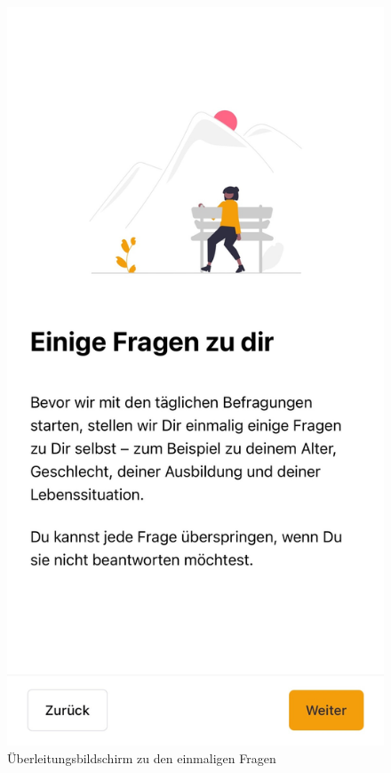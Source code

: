 \begin{figure}[h]
    \centering
    \begin{minipage}[t]{0.38\textwidth}
        \centering
        \includegraphics[width=\textwidth]{Arbeit/Bilder/printscreens/fragen_zu_dir.jpeg}
        \caption{Überleitungsbildschirm zu den einmaligen Fragen}

\end{minipage}
\end{figure}
